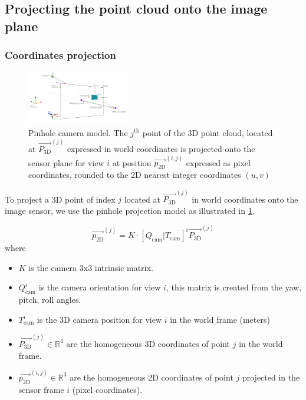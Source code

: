 \subsection{Projecting the point cloud onto the image plane}
\label{sec:projecting_the_point_cloud_onto_the_image_plane}

\subsubsection{Coordinates projection}
\label{sec:coordinates_projection}

\begin{figure}[H]
    \centering
    \includegraphics[width=0.4\textwidth]{figures/pinhole_camera_with_angles.png}
    \caption{Pinhole camera model. The $j^\text{th}$ point of the 3D point cloud, located at $\vec{P_{\textrm{3D}}}^{(j)}$ expressed in world coordinates is projected onto the sensor plane for view $i$ at position $\vec{p_{\textrm{2D}}}^{(i,j)}$ expressed as pixel coordinates, rounded to the 2D nearest integer coordinates $(u,v)$}
    \label{fig:pinhole_camera}
\end{figure}


To project a 3D point of index $j$ located at $\vec{P_{\textrm{3D}}}^{(j)}$ in world coordinates onto the image sensor,
we use the pinhole projection model as illustrated in \ref{fig:pinhole_camera}.

$$\vec{p_{\textrm{2D}}}^{(j)} = K\cdot\left[Q_{\text{cam}} | T_{\text{cam}}\right]^{i}\vec{P_{\textrm{3D}}}^{(j)}$$
where
\begin{itemize}
    \item $K$ is the camera 3x3 intrinsic matrix.
    \item $Q_{\textrm{cam}}^{i}$ is the camera orientation for view $i$, this matrix is created from the yaw, pitch, roll angles.
    \item $T_{\textrm{cam}}^{i}$ is the 3D camera position for view $i$ in the world frame (meters)
    \item $\vec{P_{\textrm{3D}}}^{(j)} \in \mathbb{R}^{4}$ are the homogeneous 3D coordinates of point $j$ in the world frame.
    \item $\vec{p_{\textrm{2D}}}^{(i,j)} \in \mathbb{R}^{3}$ are the homogeneous 2D coordinates of point $j$ projected in the sensor frame $i$ (pixel coordinates).
\end{itemize}

